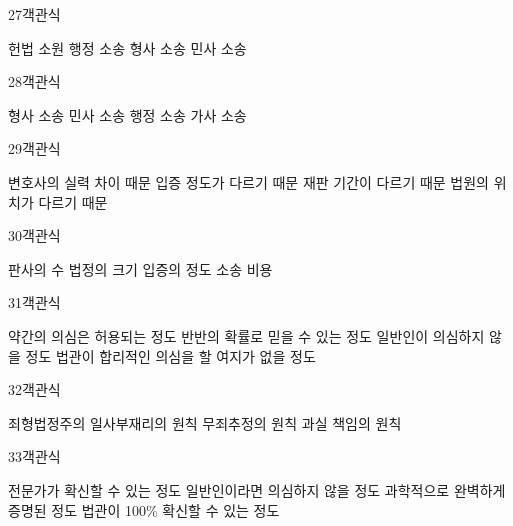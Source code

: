 \documentclass[fs9,seriesRus]{korfarm-base}
\begin{document}
\begin{kfQBlock}{27}{객관식}
\begin{kfChoices}
\kfChoice 헌법 소원
\kfChoice 행정 소송
\kfChoice 형사 소송
\kfChoice 민사 소송
\end{kfChoices}
\end{kfQBlock}
\begin{kfQBlock}{28}{객관식}
\begin{kfChoices}
\kfChoice 형사 소송
\kfChoice 민사 소송
\kfChoice 행정 소송
\kfChoice 가사 소송
\end{kfChoices}
\end{kfQBlock}
\begin{kfQBlock}{29}{객관식}
\begin{kfChoices}
\kfChoice 변호사의 실력 차이 때문
\kfChoice 입증 정도가 다르기 때문
\kfChoice 재판 기간이 다르기 때문
\kfChoice 법원의 위치가 다르기 때문
\end{kfChoices}
\end{kfQBlock}
\begin{kfQBlock}{30}{객관식}
\begin{kfChoices}
\kfChoice 판사의 수
\kfChoice 법정의 크기
\kfChoice 입증의 정도
\kfChoice 소송 비용
\end{kfChoices}
\end{kfQBlock}
\begin{kfQBlock}{31}{객관식}
\begin{kfChoices}
\kfChoice 약간의 의심은 허용되는 정도
\kfChoice 반반의 확률로 믿을 수 있는 정도
\kfChoice 일반인이 의심하지 않을 정도
\kfChoice 법관이 합리적인 의심을 할 여지가 없을 정도
\end{kfChoices}
\end{kfQBlock}
\begin{kfQBlock}{32}{객관식}
\begin{kfChoices}
\kfChoice 죄형법정주의
\kfChoice 일사부재리의 원칙
\kfChoice 무죄추정의 원칙
\kfChoice 과실 책임의 원칙
\end{kfChoices}
\end{kfQBlock}
\begin{kfQBlock}{33}{객관식}
\begin{kfChoices}
\kfChoice 전문가가 확신할 수 있는 정도
\kfChoice 일반인이라면 의심하지 않을 정도
\kfChoice 과학적으로 완벽하게 증명된 정도
\kfChoice 법관이 100\% 확신할 수 있는 정도
\end{kfChoices}
\end{kfQBlock}
\end{document}
